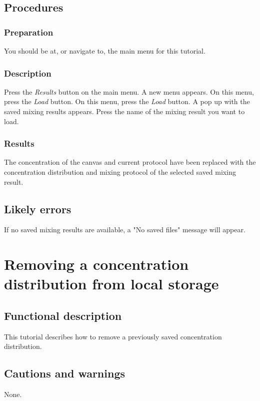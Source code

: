 \subsection{Procedures}
\subsubsection{Preparation}
You should be at, or navigate to, the main menu for this tutorial.

\subsubsection{Description}
Press the \emph{Results} button on the main menu. A new menu appears. On this menu, press the \emph{Load} button. On this menu, press the \emph{Load} button. A pop up with the saved mixing results appears. Press the name of the mixing result you want to load.

\subsubsection{Results}
The concentration of the canvas and current protocol have been replaced with the concentration distribution and mixing protocol of the selected saved mixing result.

\subsection{Likely errors}
If no saved mixing results are available, a "No saved files" message will appear. 


\section{Removing a concentration distribution from local storage}\label{sec:remdist}

\subsection{Functional description}
This tutorial describes how to remove a previously saved concentration distribution.

\subsection{Cautions and warnings}
None.


